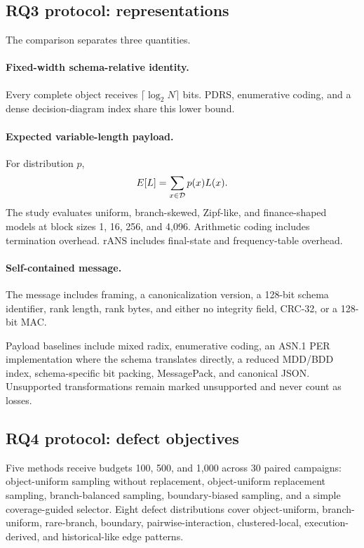 \subsection{RQ3 protocol: representations}
The comparison separates three quantities.
\paragraph{Fixed-width schema-relative identity.}
Every complete object receives \(\lceil\log_2N\rceil\) bits. PDRS, enumerative coding, and a dense decision-diagram index share this lower bound.
\paragraph{Expected variable-length payload.}
For distribution \(p\),
\begin{equation}
E[L]=\sum_{x\in\mathcal{D}}p(x)L(x).
\end{equation}
The study evaluates uniform, branch-skewed, Zipf-like, and finance-shaped models at block sizes 1, 16, 256, and 4,096. Arithmetic coding includes termination overhead. rANS includes final-state and frequency-table overhead.
\paragraph{Self-contained message.}
The message includes framing, a canonicalization version, a 128-bit schema identifier, rank length, rank bytes, and either no integrity field, CRC-32, or a 128-bit MAC.

Payload baselines include mixed radix, enumerative coding, an ASN.1 PER implementation where the schema translates directly, a reduced MDD/BDD index, schema-specific bit packing, MessagePack, and canonical JSON. Unsupported transformations remain marked unsupported and never count as losses.

\subsection{RQ4 protocol: defect objectives}
Five methods receive budgets 100, 500, and 1,000 across 30 paired campaigns: object-uniform sampling without replacement, object-uniform replacement sampling, branch-balanced sampling, boundary-biased sampling, and a simple coverage-guided selector. Eight defect distributions cover object-uniform, branch-uniform, rare-branch, boundary, pairwise-interaction, clustered-local, execution-derived, and historical-like edge patterns.

